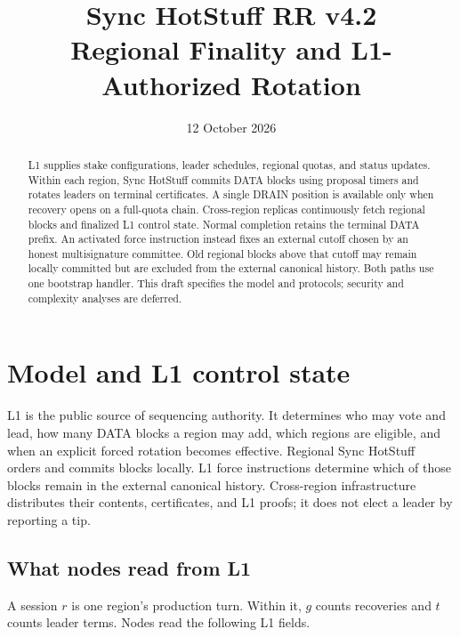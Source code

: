 \documentclass[11pt,a4paper]{article}
\title{Sync HotStuff RR v4.2\\\large Regional Finality and L1-Authorized Rotation}
\author{}\date{12 October 2026}
\newcounter{protocol}
\begin{document}
\maketitle
\begin{abstract}
L1 supplies stake configurations, leader schedules, regional quotas, and
status updates. Within each region, Sync HotStuff commits DATA blocks
using proposal timers and rotates leaders on terminal certificates.
A single DRAIN position is available only when recovery opens on a
full-quota chain. Cross-region replicas continuously fetch regional
blocks and finalized L1 control state. Normal completion retains the
terminal DATA prefix. An activated force instruction instead fixes an
external cutoff chosen by an honest multisignature committee. Old regional
blocks above that cutoff may remain locally committed but are excluded
from the external canonical history. Both paths use one bootstrap
handler. This draft specifies the model and protocols; security and
complexity analyses are deferred.
\end{abstract}

\section{Model and L1 control state}
\label{sec:model}
L1 is the public source of sequencing authority. It determines who may
vote and lead, how many DATA blocks a region may add, which regions are
eligible, and when an explicit forced rotation becomes effective.
Regional Sync HotStuff~\cite{sync} orders and commits blocks locally.
L1 force instructions determine which of those blocks remain in the
external canonical history.
Cross-region infrastructure distributes their contents, certificates, and
L1 proofs; it does not elect a leader by reporting a tip.

\subsection{What nodes read from L1}
\label{sec:l1}
A session $r$ is one region's production turn. Within it, $g$ counts
recoveries and $t$ counts leader terms. Nodes read the following L1 fields.
\end{document}
